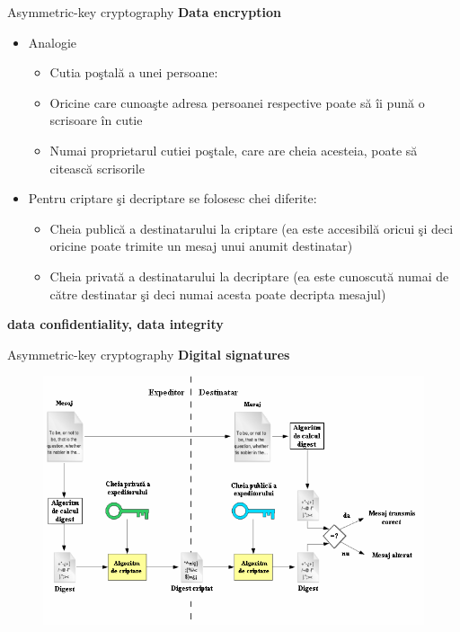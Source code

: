 \documentclass[pdf]{beamer}
\begin{document}
\begin{frame}{Asymmetric-key cryptography}
\textbf{Data encryption}
\begin{itemize}
\item
Analogie
\begin{itemize}
\item
Cutia poştală a unei persoane:
\item
Oricine care cunoaşte adresa persoanei respective poate să îi pună o scrisoare în cutie
\item
Numai proprietarul cutiei poştale, care are cheia acesteia, poate să citească scrisorile
\end{itemize}

\item
Pentru criptare şi decriptare se folosesc chei diferite:
\begin{itemize}
\item
Cheia publică a destinatarului la criptare (ea este accesibilă oricui şi deci oricine poate trimite un mesaj unui anumit destinatar)
\item
Cheia privată a destinatarului la decriptare (ea este cunoscută numai de către destinatar şi deci numai acesta poate decripta mesajul)
\end{itemize}
\end{itemize}
\textbf{data confidentiality, data integrity}
\end{frame}



\begin{frame}{Asymmetric-key cryptography}
\textbf{Digital signatures}
\begin{figure}[t]
\centering
\includegraphics[scale=0.8]{Images/asyms}
\end{figure}
\end{frame}
\end{document}
